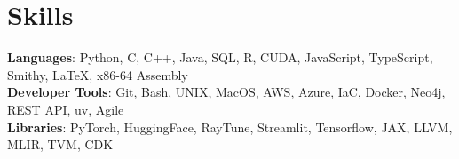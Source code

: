 \documentclass[letterpaper,11pt]{article}
\begin{document}
%
\section{Skills}
 \begin{itemize}[leftmargin=0.15in, label={}]
    \small{\item{
     \textbf{Languages}{: Python, C, C++, Java, SQL, R, CUDA, JavaScript, TypeScript, Smithy, LaTeX, x86-64 Assembly} \\
     \textbf{Developer Tools}{: Git, Bash, UNIX, MacOS, AWS, Azure, IaC, Docker, Neo4j, REST API, uv, Agile} \\
     \textbf{Libraries}{: PyTorch, HuggingFace, RayTune, Streamlit, Tensorflow, JAX, LLVM, MLIR, TVM, CDK} \\
    }}
 \end{itemize}


\end{document}
